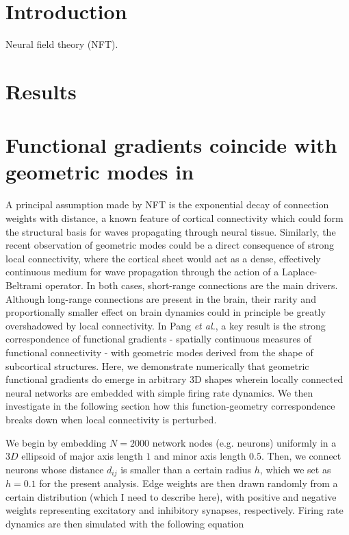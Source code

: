 \documentclass{article}
\begin{document}
\begin{multicols}{2}

\section*{Introduction}

Neural field theory (NFT).

\section*{Results}

\section*{Functional gradients coincide with geometric modes in }

A principal assumption made by NFT is the exponential decay of connection weights with distance, a known feature of cortical connectivity which could form the structural basis for waves propagating through neural tissue. Similarly, the recent observation of geometric modes could be a direct consequence of strong local connectivity, where the cortical sheet would act as a dense, effectively continuous medium for wave propagation through the action of a Laplace-Beltrami operator. In both cases, short-range connections are the main drivers. Although long-range connections are present in the brain, their rarity and proportionally smaller effect on brain dynamics could in principle be greatly overshadowed by local connectivity. In Pang \textit{et al.}, a key result is the strong correspondence of functional gradients - spatially continuous measures of functional connectivity - with geometric modes derived from the shape of subcortical structures. Here, we demonstrate numerically that geometric functional gradients do emerge in arbitrary 3D shapes wherein locally connected neural networks are embedded with simple firing rate dynamics. We then investigate in the following section how this function-geometry correspondence breaks down when local connectivity is perturbed.

We begin by embedding $N=2000$ network nodes (e.g. neurons) uniformly in a $3D$ ellipsoid of major axis length $1$ and minor axis length $0.5$. Then, we connect neurons whose distance $d_{ij}$ is smaller than a certain radius $h$, which we set as $h=0.1$ for the present analysis. Edge weights are then drawn randomly from a certain distribution (which I need to describe here), with positive and negative weights representing excitatory and inhibitory synapses, respectively. Firing rate dynamics are then simulated with the following equation


\end{multicols}
\end{document}
